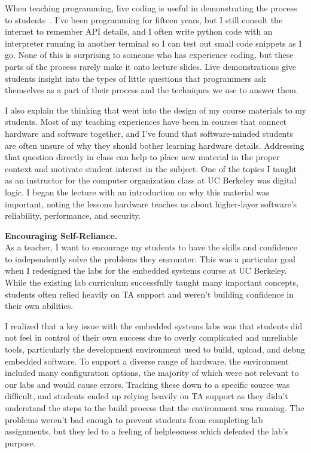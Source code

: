 \documentclass[11pt]{article} %
\begin{document}
When teaching programming, live coding is useful in demonstrating the process
to students~\footnotemark{}. I've been programming for fifteen years, but I still
consult the internet to remember API details, and I often write python code
with an interpreter running in another terminal so I can test out small code
snippets as I go. None of this is surprising to someone who has experience
coding, but these parts of the process rarely make it onto lecture slides. Live
demonstrations give students insight into the types of little questions that
programmers ask themselves as a part of their process and the techniques we use
to answer them.


I also explain the thinking that went into the design of my course materials
to my students.
%
Most of my teaching experiences have been in courses that connect hardware and
software together, and I've found that software-minded students are often
unsure of why they should bother learning hardware details. Addressing that
question directly in class can help to place new material in the proper context
and motivate student interest in the subject.
%
One of the topics I taught as an instructor for the computer organization class
at UC Berkeley was digital logic. I began the lecture with an introduction on
why this material was important, noting the lessons hardware teaches us about
higher-layer software's reliability, performance, and security.


\bigskip
\textbf{\textsf{\large Encouraging Self-Reliance.}}\\
As a teacher, I want to encourage my students to have the skills and confidence
to independently solve the problems they encounter.
%
This was a particular goal when I redesigned the labs for the embedded systems
course at UC Berkeley.
%
While the existing lab curriculum successfully taught many important concepts,
students often relied heavily on TA support and weren't building confidence in
their own abilities.

I realized that a key issue with the embedded systems labs was that students
did not feel in control of their own success due to overly complicated and
unreliable tools, particularly the development environment used to build,
upload, and debug embedded software. To support a diverse range of hardware,
the environment included many configuration options, the majority of which were
not relevant to our labs and would cause errors. Tracking these down to a
specific source was difficult, and students ended up relying heavily on TA
support as they didn't understand the steps to the build process that the
environment was running. The problems weren't bad enough to prevent students
from completing lab assignments, but they led to a feeling of helplessness
which defeated the lab's purpose.
\end{document}
